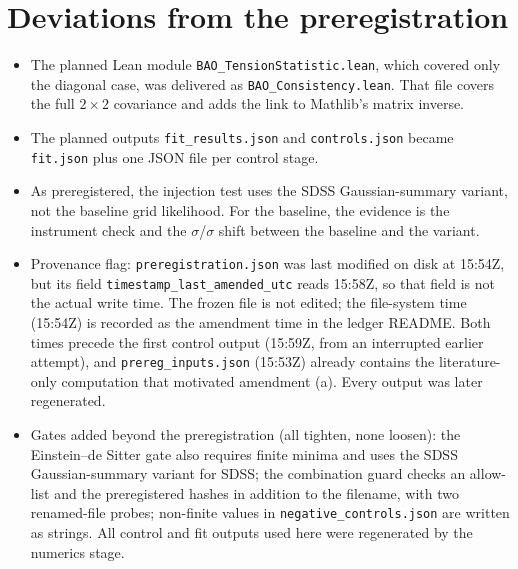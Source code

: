 \documentclass[11pt]{article}
\begin{document}
\section{Deviations from the preregistration}
\begin{itemize}
\item The planned Lean module \texttt{BAO\_TensionStatistic.lean}, which
  covered only the diagonal case, was delivered as
  \texttt{BAO\_Consistency.lean}. That file covers the full $2\times2$
  covariance and adds the link to Mathlib's matrix inverse.
\item The planned outputs \texttt{fit\_results.json} and
  \texttt{controls.json} became \texttt{fit.json} plus one JSON file per
  control stage.
\item As preregistered, the injection test uses the SDSS Gaussian-summary
  variant, not the baseline grid likelihood. For the baseline, the evidence
  is the instrument check and the \ShiftOm$\sigma$/\ShiftHrd$\sigma$ shift
  between the baseline and the variant.
\item Provenance flag: \texttt{preregistration.json} was last modified on
  disk at 15:54Z, but its field \texttt{timestamp\_last\_amended\_utc} reads
  15:58Z, so that field is not the actual write time. The frozen file is not
  edited; the file-system time (15:54Z) is recorded as the amendment time in
  the ledger README. Both times precede the first control output (15:59Z,
  from an interrupted earlier attempt), and \texttt{prereg\_inputs.json}
  (15:53Z) already contains the literature-only computation that motivated
  amendment (a). Every output was later regenerated.
\item Gates added beyond the preregistration (all tighten, none loosen):
  the Einstein--de Sitter gate also requires finite minima and uses the
  SDSS Gaussian-summary variant for SDSS; the combination guard checks an
  allow-list and the preregistered hashes in addition to the filename,
  with two renamed-file probes; non-finite values in
  \texttt{negative\_controls.json} are written as strings. All control and
  fit outputs used here were regenerated by the numerics stage.
\end{itemize}
\end{document}
